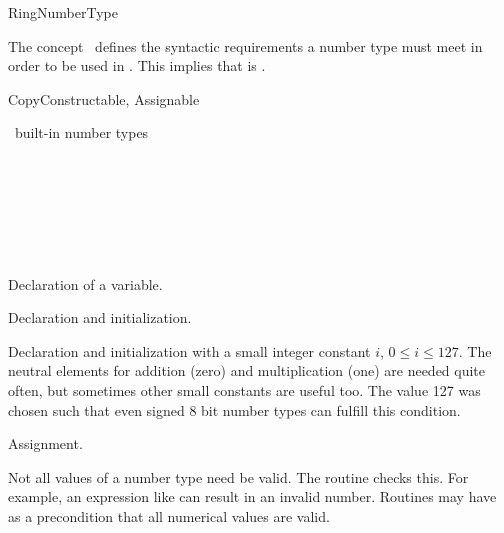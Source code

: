 \begin{ccRefConcept}{RingNumberType}

\ccDefinition

The concept \ccRefName\ defines the syntactic requirements a number type must
meet in order to be used in \cgal.  This implies that
 is 
.

\ccRefines

CopyConstructable, Assignable 


\ccHasModels

\CC\ built-in number types \\
 \\
 \\
 \\
 \\
 \\
 \\


\ccTypes

\ccSetTwoColumns{}{\hspace*{8.5cm}}
\ccCreation
{}

            {Declaration of a variable.}


            {Declaration and initialization.}


            {Declaration and initialization with a small integer
constant $i$, $0 \leq i \leq 127$. The neutral elements for addition
(zero) and multiplication (one) are needed quite often, but sometimes
other small constants are useful too. The value 127 was chosen such
that even signed 8 bit number types can fulfill this condition.  }

\ccOperations
{}
        {Assignment.  }


{Not all values of a number type need be valid. The routine
 checks this. For example, an expression like
 can result in an invalid number. Routines may
have as a precondition that all numerical values are valid.}


\end{ccRefConcept}
